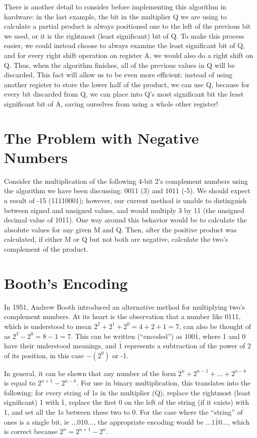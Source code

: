 \documentclass{article}
\begin{document}
There is another detail to consider before implementing this algorithm in hardware: in the last example, the bit in the multiplier Q we are using to calculate a partial product is always positioned one to the left of the previous bit we used, or it is the rightmost (least significant) bit of Q.
To make this process easier, we could instead choose to always examine the least significant bit of Q, and for every right shift operation on register A, we would also do a right shift on Q.
Thus, when the algorithm finishes, all of the previous values in Q will be discarded.
This fact will allow us to be even more efficient: instead of using another register to store the lower half of the product, we can use Q, because for every bit discarded from Q, we can place into Q's most significant bit the least significant bit of A, saving ourselves from using a whole other register!


\section{The Problem with Negative Numbers}
Consider the multiplication of the following 4-bit 2's complement numbers using the algorithm we have been discussing: 0011 (3) and 1011 (-5).
We should expect a result of -15 (11110001); however, our current method is unable to distinguish between signed and unsigned values, and would multiply 3 by 11 (the unsigned decimal value of 1011).
One way around this behavior would be to calculate the absolute values for any given M and Q.
Then, after the positive product was calculated, if either M or Q but not both are negative, calculate the two's complement of the product.

\section{Booth's Encoding}
In 1951, Andrew Booth introduced an alternative method for multiplying two's complement numbers.
At its heart is the observation that a number like 0111, which is understood to mean $2^2 + 2^1 + 2^0 = 4 + 2 + 1 = 7$, can also be thought of as $2^3 - 2^0 = 8 - 1 = 7$.
This can be written (``encoded'') as $100\bar{1}$, where 1 and 0 have their understood meanings, and $\bar{1}$ represents a subtraction of the power of 2 of its position, in this case $-(2^0)$ or -1.

    In general, it can be shown that any number of the form $2^n + 2^{n-1} + ...
+ 2^{n-k}$ is equal to $2^{n+1} - 2^{n-k}$.
For use in binary multiplication, this translates into the following: for every string of 1s in the multiplier (Q), replace the rightmost (least significant) 1 with $\bar{1}$, replace the first 0 on the left of the string (if it exists) with 1, and set all the 1s between these two to 0.
For the case where the ``string'' of ones is a single bit, ie $...010...$,
the appropriate encoding would be $...1\bar{1}0...$,
which is correct because $2^n = 2^{n+1} - 2^n$.
\end{document}
